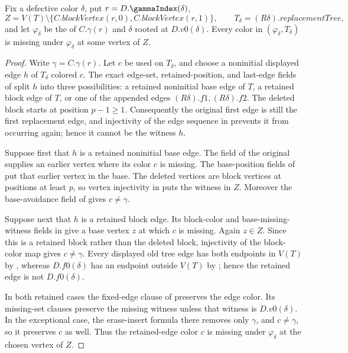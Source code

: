 \begin{helper}
Fix a defective color $\delta$, put $r=D.\gammaIndex(\delta)$,
\[
 Z=V(T)\setminus\{C.\mathit{blockVertex}(r,0),
                   C.\mathit{blockVertex}(r,1)\},
 \qquad T_\delta=(R\delta).\mathit{replacementTree},
\]
and let $\varphi_\delta$ be the
 of $C.\gamma(r)$ and $\delta$ rooted at
$D.v0(\delta)$.  Every color in
$(\varphi_\delta,T_\delta)$ is missing under
$\varphi_\delta$ at some vertex of $Z$.
\end{helper}
\begin{proof}
Write $\gamma=C.\gamma(r)$.  Let $c$ be used on $T_\delta$, and choose a
noninitial displayed edge $h$ of $T_\delta$ colored $c$.  The exact
edge-set, retained-position, and last-edge fields of
 split $h$ into three possibilities: a
retained noninitial base edge of $T$, a retained block edge of $T$, or
one of the appended edges $(R\delta).f1,(R\delta).f2$.  The deleted block
starts at position $p-1\ge1$.  Consequently the original first edge is
still the first replacement edge, and injectivity of the edge sequence in
 prevents it from occurring again; hence it cannot
be the witness $h$.

Suppose first that $h$ is a retained noninitial base edge.  The
 field of the original
 supplies an earlier vertex where its color
$c$ is missing.  The base-position fields of
 put that earlier vertex in the
base.  The deleted vertices are block vertices at positions at least
$p$, so vertex injectivity in  puts the witness in
$Z$.  Moreover the base-avoidance field of
 gives $c\ne\gamma$.

Suppose next that $h$ is a retained block edge.  Its block-color and
base-missing-witness fields in
 give a base vertex $z$ at which
$c$ is missing.  Again $z\in Z$.  Since this is a retained block rather
than the deleted block, injectivity of the block-color map gives
$c\ne\gamma$.  Every displayed old tree edge has both endpoints in
$V(T)$ by , whereas $D.f0(\delta)$ has an endpoint
outside $V(T)$ by ; hence the retained
edge is not $D.f0(\delta)$.

In both retained cases the fixed-edge clause of
 preserves the edge color.  Its
missing-set clauses preserve the missing witness unless that witness is
$D.v0(\delta)$.  In the exceptional case, the erase-insert formula there
removes only $\gamma$, and $c\ne\gamma$, so it preserves $c$ as well.
Thus the retained-edge color $c$ is missing under $\varphi_\delta$ at the
chosen vertex of $Z$.


\end{proof}
